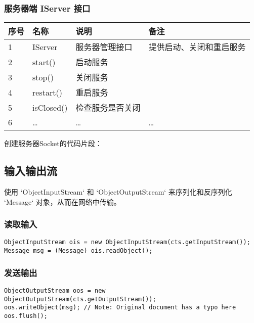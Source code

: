 \documentclass[a4paper]{ctexart}
\begin{document}
\subsubsection{服务器端 IServer 接口}
\begin{tabular}{llll}
    \toprule
    \textbf{序号} & \textbf{名称} & \textbf{说明} & \textbf{备注}  \\
    \midrule
    1           & IServer     & 服务器管理接口     & 提供启动、关闭和重启服务 \\
    2           & start()     & 启动服务        &              \\
    3           & stop()      & 关闭服务        &              \\
    4           & restart()   & 重启服务        &              \\
    5           & isClosed()  & 检查服务是否关闭    &              \\
    6           & …           & …           & …            \\
    \bottomrule
\end{tabular}
\vspace{1em}
创建服务器Socket的代码片段：
\begin{comment}
\begin{lstlisting}
// 创建服务器Socket
serverSocket = new ServerSocket(IConstant.SERVER_PORT);
\end{lstlisting}
\end{comment}
\subsection{输入输出流}
使用 `ObjectInputStream` 和 `ObjectOutputStream` 来序列化和反序列化 `Message` 对象，从而在网络中传输。

\subsubsection{读取输入}
\begin{lstlisting}
ObjectInputStream ois = new ObjectInputStream(cts.getInputStream());
Message msg = (Message) ois.readObject();
\end{lstlisting}

\subsubsection{发送输出}
\begin{lstlisting}
ObjectOutputStream oos = new ObjectOutputStream(cts.getOutputStream());
oos.writeObject(msg); // Note: Original document has a typo here
oos.flush();
\end{lstlisting}
\end{document}
